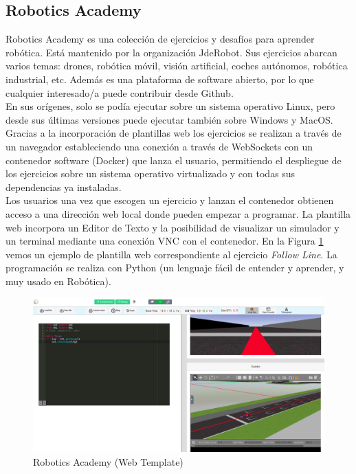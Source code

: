 \subsection{Robotics Academy}
\label{subsec:robotics_academy}
Robotics Academy \cite{robotics-academy} es una colección de ejercicios y desafíos para aprender robótica. Está mantenido por la organización JdeRobot. Sus ejercicios abarcan varios temas: drones, robótica móvil, visión artificial, coches autónomos, robótica industrial, etc. Además es una plataforma de software abierto, por lo que cualquier interesado/a puede contribuir desde Github.\\

En sus orígenes, solo se podía ejecutar sobre un sistema operativo Linux, pero desde sus últimas versiones puede ejecutar también sobre Windows y MacOS. Gracias a la incorporación de plantillas web los ejercicios se realizan a través de un navegador estableciendo una conexión a través de WebSockets con un contenedor software (Docker) que lanza el usuario, permitiendo el despliegue de los ejercicios sobre un sistema operativo virtualizado y con todas sus dependencias ya instaladas.\\

Los usuarios una vez que escogen un ejercicio y lanzan el contenedor obtienen acceso a una dirección web local donde pueden empezar a programar. La plantilla web incorpora un Editor de Texto y la posibilidad de visualizar un simulador y un terminal mediante una conexión VNC con el contenedor. En la Figura \ref{fig:rob-ac-web-template} vemos un ejemplo de plantilla web correspondiente al ejercicio \textit{Follow Line}. La programación se realiza con Python (un lenguaje fácil de entender y aprender, y muy usado en Robótica).\\

\begin{figure} [H]
  \begin{center}
    \includegraphics[width=12cm]{imagenes/cap1/robotics-academy-web-template.png}
  \end{center}
  \caption[Robotics Academy (Web Template)]{Robotics Academy (Web Template)}
  \label{fig:rob-ac-web-template}
\end{figure}\

